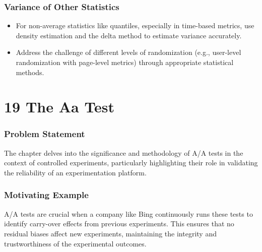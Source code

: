 \documentclass{article}
\begin{document}
\subsubsection*{Variance of Other Statistics}
\begin{itemize}
    \item For non-average statistics like quantiles, especially in time-based metrics, use density estimation and the delta method to estimate variance accurately.
    \item Address the challenge of different levels of randomization (e.g., user-level randomization with page-level metrics) through appropriate statistical methods.
\end{itemize}

\section*{19 The Aa Test}
\subsubsection*{Problem Statement}
The chapter delves into the significance and methodology of A/A tests in the context of controlled experiments, particularly highlighting their role in validating the reliability of an experimentation platform.

\subsubsection*{Motivating Example}
A/A tests are crucial when a company like Bing continuously runs these tests to identify carry-over effects from previous experiments. This ensures that no residual biases affect new experiments, maintaining the integrity and trustworthiness of the experimental outcomes.
\end{document}
